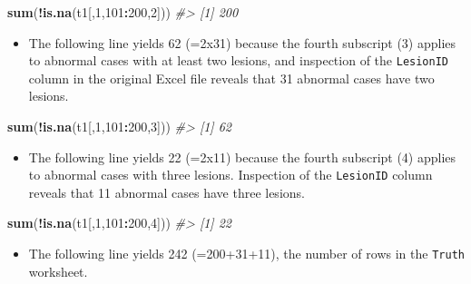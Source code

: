 \documentclass[]{book}
\newenvironment{Shaded}{\begin{snugshade}}{\end{snugshade}}
\newcommand{\CommentTok}[1]{\textcolor[rgb]{0.56,0.35,0.01}{\textit{#1}}}
\newcommand{\DecValTok}[1]{\textcolor[rgb]{0.00,0.00,0.81}{#1}}
\newcommand{\KeywordTok}[1]{\textcolor[rgb]{0.13,0.29,0.53}{\textbf{#1}}}
\newcommand{\NormalTok}[1]{#1}
\newcommand{\OperatorTok}[1]{\textcolor[rgb]{0.81,0.36,0.00}{\textbf{#1}}}
\providecommand{\tightlist}{%
  \setlength{\itemsep}{0pt}\setlength{\parskip}{0pt}}
\begin{document}
\begin{Shaded}
\begin{Highlighting}[]
\KeywordTok{sum}\NormalTok{(}\OperatorTok{!}\KeywordTok{is.na}\NormalTok{(t1[,}\DecValTok{1}\NormalTok{,}\DecValTok{101}\OperatorTok{:}\DecValTok{200}\NormalTok{,}\DecValTok{2}\NormalTok{]))}
\CommentTok{#> [1] 200}
\end{Highlighting}
\end{Shaded}

\begin{itemize}
\tightlist
\item
  The following line yields 62 (=2x31) because the fourth subscript (3) applies to abnormal cases with at least two lesions, and inspection of the \texttt{LesionID} column in the original Excel file reveals that 31 abnormal cases have two lesions.
\end{itemize}

\begin{Shaded}
\begin{Highlighting}[]
\KeywordTok{sum}\NormalTok{(}\OperatorTok{!}\KeywordTok{is.na}\NormalTok{(t1[,}\DecValTok{1}\NormalTok{,}\DecValTok{101}\OperatorTok{:}\DecValTok{200}\NormalTok{,}\DecValTok{3}\NormalTok{]))}
\CommentTok{#> [1] 62}
\end{Highlighting}
\end{Shaded}

\begin{itemize}
\tightlist
\item
  The following line yields 22 (=2x11) because the fourth subscript (4) applies to abnormal cases with three lesions. Inspection of the \texttt{LesionID} column reveals that 11 abnormal cases have three lesions.
\end{itemize}

\begin{Shaded}
\begin{Highlighting}[]
\KeywordTok{sum}\NormalTok{(}\OperatorTok{!}\KeywordTok{is.na}\NormalTok{(t1[,}\DecValTok{1}\NormalTok{,}\DecValTok{101}\OperatorTok{:}\DecValTok{200}\NormalTok{,}\DecValTok{4}\NormalTok{]))}
\CommentTok{#> [1] 22}
\end{Highlighting}
\end{Shaded}

\begin{itemize}
\tightlist
\item
  The following line yields 242 (=200+31+11), the number of rows in the \texttt{Truth} worksheet.
\end{itemize}
\end{document}
